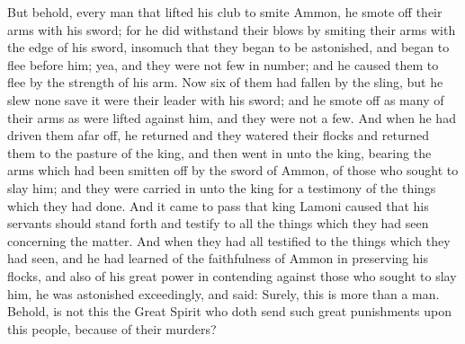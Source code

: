 But behold, every man that lifted his club to smite Ammon, he smote off their arms with his sword; for he did withstand their blows by smiting their arms with the edge of his sword, insomuch that they began to be astonished, and began to flee before him; yea, and they were not few in number; and he caused them to flee by the strength of his arm.
\bverse \iffalse Now six of them had fallen by the sling, but he slew none save it were their leader with his sword; and he smote off as many of their arms as were lifted against him, and they were not a few. \fi
Now six of them had fallen by the sling, but he slew none save it were their leader with his sword; and he smote off as many of their arms as were lifted against him, and they were not a few.
\bverse \iffalse And when he had driven them afar off, he returned and they watered their flocks and returned them to the pasture of the king, and then went in unto the king, bearing the arms which had been smitten off by the sword of Ammon, of those who sought to slay him; and they were carried in unto the king for a testimony of the things which they had done. \fi
And when he had driven them afar off, he returned and they watered their flocks and returned them to the pasture of the king, and then went in unto the king, bearing the arms which had been smitten off by the sword of Ammon, of those who sought to slay him; and they were carried in unto the king for a testimony of the things which they had done.
\bchapter
\bverse \iffalse And it came to pass that king Lamoni caused that his servants should stand forth and testify to all the things which they had seen concerning the matter. \fi
And it came to pass that king Lamoni caused that his servants should stand forth and testify to all the things which they had seen concerning the matter.
\bverse \iffalse And when they had all testified to the things which they had seen, and he had learned of the faithfulness of Ammon in preserving his flocks, and also of his great power in contending against those who sought to slay him, he was astonished exceedingly, and said: Surely, this is more than a man. Behold, is not this the Great Spirit who doth send such great punishments upon this people, because of their murders? \fi
And when they had all testified to the things which they had seen, and he had learned of the faithfulness of Ammon in preserving his flocks, and also of his great power in contending against those who sought to slay him, he was astonished exceedingly, and said: Surely, this is more than a man. Behold, is not this the Great Spirit who doth send such great punishments upon this people, because of their murders?
